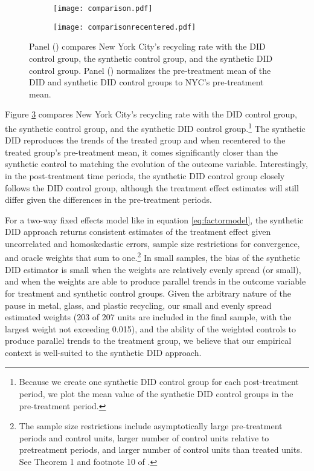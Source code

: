 \documentclass[12pt]{article}
\begin{document}
\begin{figure}
\centering
\begin{subfigure}[t]{.49\textwidth}
    \centering
    \vspace{0pt}
     \texttt{[image: comparison.pdf]}
        \caption{}\label{fig:comparisonpanel}
\end{subfigure}
    \begin{subfigure}[t]{.49\textwidth}
    \centering
    \vspace{0pt}
     \texttt{[image: comparisonrecentered.pdf]}
        \caption{}\label{fig:comparisonrecentered}
\end{subfigure}
    \caption{Panel () compares New York City's recycling rate with the DID control group, the synthetic control group, and the synthetic DID control group. Panel () normalizes the pre-treatment mean of the DID and synthetic DID control groups to NYC's pre-treatment mean.} \label{fig:comparison}
\end{figure}

Figure \ref{fig:comparison} compares New York City's recycling rate with the DID control group, the synthetic control group, and the synthetic DID control group.\footnote{Because we create one synthetic DID control group for each post-treatment period, we plot the mean value of the synthetic DID control groups in the pre-treatment period.}  The synthetic DID reproduces the trends of the treated group and when recentered to the treated group's pre-treatment mean, it comes significantly closer than the synthetic control to matching the evolution of the outcome variable.  Interestingly, in the post-treatment time periods, the synthetic DID control group closely follows the DID control group, although the treatment effect estimates will still differ given the differences in the pre-treatment periods.

For a two-way fixed effects model like in equation \ref{eq:factormodel}, the synthetic DID approach returns consistent estimates of the treatment effect given uncorrelated and homoskedastic errors, sample size restrictions for convergence, and oracle weights that sum to one.\footnote{The sample size restrictions include asymptotically large pre-treatment periods and control units, larger number of control units relative to pretreatment periods, and larger number of control units than treated units.  See Theorem 1 and footnote 10 of \cite{arkhangelsky2021}.}  In small samples, the bias of the synthetic DID estimator is small when the weights are relatively evenly spread (or small), and when the weights are able to produce parallel trends in the outcome variable for treatment and synthetic control groups. Given the arbitrary nature of the pause in metal, glass, and plastic recycling, our small and evenly spread estimated weights (203 of 207 units are included in the final sample, with the largest weight not exceeding 0.015), and the ability of the weighted controls to produce parallel trends to the treatment group, we believe that our empirical context is well-suited to the synthetic DID approach.
\end{document}
